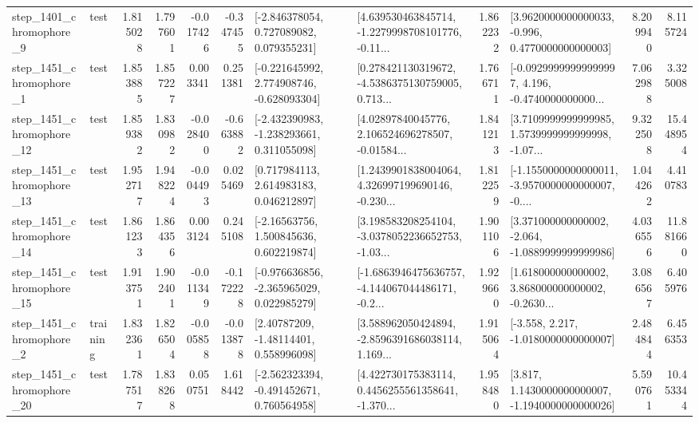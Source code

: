 \begin{tabular}{llrrrrllrlrr}
  step\_1401\_chromophore\_9 &      test &      1.815028 &    1.797601 &     -0.017426 & -0.347455 &    [-2.846378054, 0.727089082, 0.079355231] &  [4.639530463845714, -1.2279998708101776, -0.11... &       1.862232 &   [3.9620000000000033, -0.996, 0.4770000000000003] &            8.209940 &          8.115724 \\
  step\_1451\_chromophore\_1 &      test &      1.853885 &    1.857227 &      0.003341 &  0.251381 &   [-0.221645992, 2.774908746, -0.628093304] &  [0.278421130319672, -4.5386375130759005, 0.713... &       1.766711 &  [-0.09299999999999997, 4.196, -0.4740000000000... &            7.062988 &          3.325008 \\
 step\_1451\_chromophore\_12 &      test &      1.859382 &    1.830982 &     -0.028400 & -0.663882 &   [-2.432390983, -1.238293661, 0.311055098] &  [4.02897840045776, 2.106524696278507, -0.01584... &       1.841213 &  [3.7109999999999985, 1.5739999999999998, -1.07... &            9.322508 &         15.448954 \\
 step\_1451\_chromophore\_13 &      test &      1.952717 &    1.948224 &     -0.004493 &  0.025469 &     [0.717984113, 2.614983183, 0.046212897] &  [1.2439901838004064, 4.326997199690146, -0.230... &       1.812259 &  [-1.1550000000000011, -3.9570000000000007, -0.... &            1.044262 &          4.410783 \\
 step\_1451\_chromophore\_14 &      test &      1.861233 &    1.864356 &      0.003124 &  0.245108 &     [-2.16563756, 1.500845636, 0.602219874] &  [3.198583208254104, -3.0378052236652753, -1.03... &       1.901106 &   [3.371000000000002, -2.064, -1.0889999999999986] &            4.036556 &         11.881660 \\
 step\_1451\_chromophore\_15 &      test &      1.913751 &    1.902401 &     -0.011349 & -0.172228 &   [-0.976636856, -2.365965029, 0.022985279] &  [-1.6863946475636757, -4.144067044486171, -0.2... &       1.929660 &  [1.618000000000002, 3.868000000000002, -0.2630... &            3.086567 &          6.405976 \\
  step\_1451\_chromophore\_2 &  training &      1.832361 &    1.826504 &     -0.005858 & -0.013878 &      [2.40787209, -1.48114401, 0.558996098] &  [3.588962050424894, -2.8596391686038114, 1.169... &       1.915064 &               [-3.558, 2.217, -1.0180000000000007] &            2.484844 &          6.456353 \\
 step\_1451\_chromophore\_20 &      test &      1.787517 &    1.838268 &      0.050751 &  1.618442 &   [-2.562323394, -0.491452671, 0.760564958] &  [4.422730175383114, 0.4456255561358641, -1.370... &       1.958480 &   [3.817, 1.1430000000000007, -1.1940000000000026] &            5.590761 &         10.453344 \\

\end{tabular}
